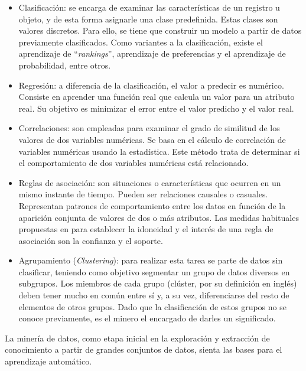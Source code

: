 \begin{itemize}
	\item Clasificación: se encarga de examinar las características de un registro u objeto, y de esta forma asignarle una clase predefinida. Estas clases son valores discretos. Para ello, se tiene que construir un modelo a partir de datos previamente clasificados. Como variantes a la clasificación, existe el aprendizaje de “\textit{rankings}”, aprendizaje de preferencias y el aprendizaje de probabilidad, entre otros. 
	\item Regresión: a diferencia de la clasificación, el valor a predecir es numérico. Consiste en aprender una función real que calcula un valor para un atributo real. Su objetivo es minimizar el error entre el valor predicho y el valor real.
	\item  Correlaciones: son empleadas para examinar el grado de similitud de los valores de dos variables numéricas. Se basa en el cálculo de correlación de variables numéricas usando la estadística. Este método trata de determinar si el comportamiento de dos variables numéricas está relacionado.
	\item Reglas de asociación: son situaciones o características que ocurren en un mismo instante de tiempo. Pueden ser relaciones causales o casuales. Representan patrones de comportamiento entre los datos en función de la aparición conjunta de valores de dos o más atributos. Las medidas habituales propuestas en \citep{Agrawal1519}	para establecer la idoneidad y el interés de una regla de asociación son la confianza y el soporte.
	\item	Agrupamiento (\textit{Clustering}): para realizar esta tarea se parte de datos sin clasificar, teniendo como objetivo segmentar un grupo de datos diversos en subgrupos. Los miembros de cada grupo (clúster, por su definición en inglés) deben tener mucho en común entre sí y, a su vez, diferenciarse del resto de elementos de otros grupos. Dado que la clasificación de estos grupos no se conoce previamente, es el minero el encargado de darles un significado.
\end{itemize}

La minería de datos, como etapa inicial en la exploración y extracción de conocimiento a partir de grandes conjuntos de datos, sienta las bases para el aprendizaje automático.

